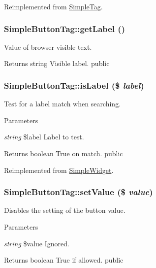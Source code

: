 Reimplemented from \hyperlink{class_simple_tag_a158fcbf8b82e7a6f7b6855c1dbe0715b}{SimpleTag}.\hypertarget{class_simple_button_tag_a2546c1ec1cc7e096da711cdb66a3178d}{
\subsubsection[{getLabel}]{\setlength{\rightskip}{0pt plus 5cm}SimpleButtonTag::getLabel ()}}
\label{class_simple_button_tag_a2546c1ec1cc7e096da711cdb66a3178d}
Value of browser visible text. \begin{DoxyReturn}{Returns}
string Visible label.  public 
\end{DoxyReturn}
\hypertarget{class_simple_button_tag_a5efa27afe64fbb8ce8ef546df97c0db5}{
\subsubsection[{isLabel}]{\setlength{\rightskip}{0pt plus 5cm}SimpleButtonTag::isLabel (\$ {\em label})}}
\label{class_simple_button_tag_a5efa27afe64fbb8ce8ef546df97c0db5}
Test for a label match when searching. 
\begin{DoxyParams}{Parameters}
\item[{\em string}]\$label Label to test. \end{DoxyParams}
\begin{DoxyReturn}{Returns}
boolean True on match.  public 
\end{DoxyReturn}


Reimplemented from \hyperlink{class_simple_widget_ab4560f7a1b68df77c3ee34f6bc81dcab}{SimpleWidget}.\hypertarget{class_simple_button_tag_a36d1a217cd1a0ec83bc0de7d7d436057}{
\subsubsection[{setValue}]{\setlength{\rightskip}{0pt plus 5cm}SimpleButtonTag::setValue (\$ {\em value})}}
\label{class_simple_button_tag_a36d1a217cd1a0ec83bc0de7d7d436057}
Disables the setting of the button value. 
\begin{DoxyParams}{Parameters}
\item[{\em string}]\$value Ignored. \end{DoxyParams}
\begin{DoxyReturn}{Returns}
boolean True if allowed.  public 
\end{DoxyReturn}


